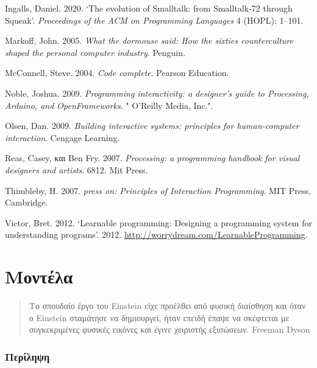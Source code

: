 \documentclass[
]{article}
\begin{document}
Ingalls, Daniel. 2020. {`The evolution of Smalltalk: from Smalltalk-72
through Squeak'}. \emph{Proceedings of the ACM on Programming Languages}
4 (HOPL): 1--101.

Markoff, John. 2005. \emph{What the dormouse said: How the sixties
counterculture shaped the personal computer industry}. Penguin.

McConnell, Steve. 2004. \emph{Code complete}. Pearson Education.

Noble, Joshua. 2009. \emph{Programming interactivity: a designer's guide
to Processing, Arduino, and OpenFrameworks}. " O'Reilly Media, Inc.".

Olsen, Dan. 2009. \emph{Building interactive systems: principles for
human-computer interaction}. Cengage Learning.

Reas, Casey, και Ben Fry. 2007. \emph{Processing: a programming handbook
for visual designers and artists}. 6812. Mit Press.

Thimbleby, H. 2007. \emph{press on: Principles of Interaction
Programming}. MIT Press, Cambridge.

Victor, Bret. 2012. {`Learnable programming: Designing a programming
system for understanding programs'}. 2012.
\url{http://worrydream.com/LearnableProgramming}.

\hypertarget{ux3bcux3bfux3bdux3c4ux3adux3bbux3b1}{%
\section{Μοντέλα}\label{ux3bcux3bfux3bdux3c4ux3adux3bbux3b1}}

\begin{quote}
Το σπουδαίο έργο του Einstein είχε προέλθει από φυσική διαίσθηση και
όταν ο Einstein σταμάτησε να δημιουργεί, ήταν επειδή έπαψε να σκέφτεται
με συγκεκριμένες φυσικές εικόνες και έγινε χειριστής εξισώσεων. Freeman
Dyson
\end{quote}

\hypertarget{ux3c0ux3b5ux3c1ux3afux3bbux3b7ux3c8ux3b7}{%
\subsubsection{Περίληψη}\label{ux3c0ux3b5ux3c1ux3afux3bbux3b7ux3c8ux3b7}}
\end{document}
